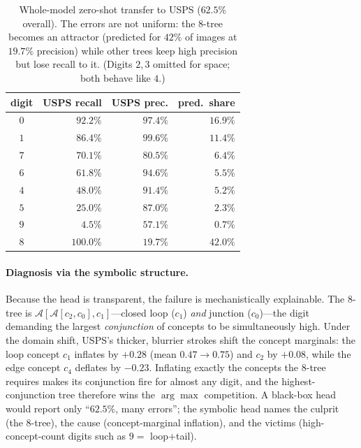 \begin{table}[t]
\centering
\small
\begin{tabular}{crrr}
\toprule
digit & USPS recall & USPS prec. & pred.\ share \\
\midrule
$0$ & $92.2\%$ & $97.4\%$ & $16.9\%$ \\
$1$ & $86.4\%$ & $99.6\%$ & $11.4\%$ \\
$7$ & $70.1\%$ & $80.5\%$ & $6.4\%$ \\
$6$ & $61.8\%$ & $94.6\%$ & $5.5\%$ \\
$4$ & $48.0\%$ & $91.4\%$ & $5.2\%$ \\
$5$ & $25.0\%$ & $87.0\%$ & $2.3\%$ \\
$9$ & $\phantom{0}4.5\%$ & $57.1\%$ & $0.7\%$ \\
$8$ & $100.0\%$ & $\mathbf{19.7\%}$ & $\mathbf{42.0\%}$ \\
\bottomrule
\end{tabular}
\caption{Whole-model zero-shot transfer to USPS ($62.5\%$ overall). The errors
are not uniform: the $8$-tree becomes an attractor (predicted for $42\%$ of
images at $19.7\%$ precision) while other trees keep high precision but lose
recall to it. (Digits $2,3$ omitted for space; both behave like $4$.)}
\label{tab:tree-transfer}
\end{table}

\paragraph{Diagnosis via the symbolic structure.}
Because the head is transparent, the failure is mechanistically explainable. The
$8$-tree is $\mathcal{A}[\mathcal{A}[c_2,c_0],c_1]$---closed loop ($c_1$)
\emph{and} junction ($c_0$)---the digit demanding the largest \emph{conjunction}
of concepts to be simultaneously high. Under the domain shift, USPS's thicker,
blurrier strokes shift the concept marginals: the loop concept $c_1$ inflates by
$+0.28$ (mean $0.47\!\rightarrow\!0.75$) and $c_2$ by $+0.08$, while the edge
concept $c_4$ deflates by $-0.23$. Inflating exactly the concepts the $8$-tree
requires makes its conjunction fire for almost any digit, and the
highest-conjunction tree therefore wins the $\arg\max$ competition. A black-box
head would report only ``$62.5\%$, many errors''; the symbolic head names the
culprit (the $8$-tree), the cause (concept-marginal inflation), and the victims
(high-concept-count digits such as $9=$ loop$+$tail).

